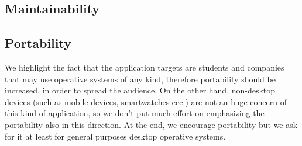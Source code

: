 		\subsection{Maintainability}
			
		\subsection{Portability}
			We highlight the fact that the application targets are students and companies that may use operative systems of any kind, therefore portability should be increased, in order to spread the audience. On the other hand, non-desktop devices (such as mobile devices, smartwatches ecc.) are not an huge concern of this kind of application, so we don't put much effort on emphasizing the portability also in this direction. At the end, we encourage portability but we ask for it at least for general purposes desktop operative systems.